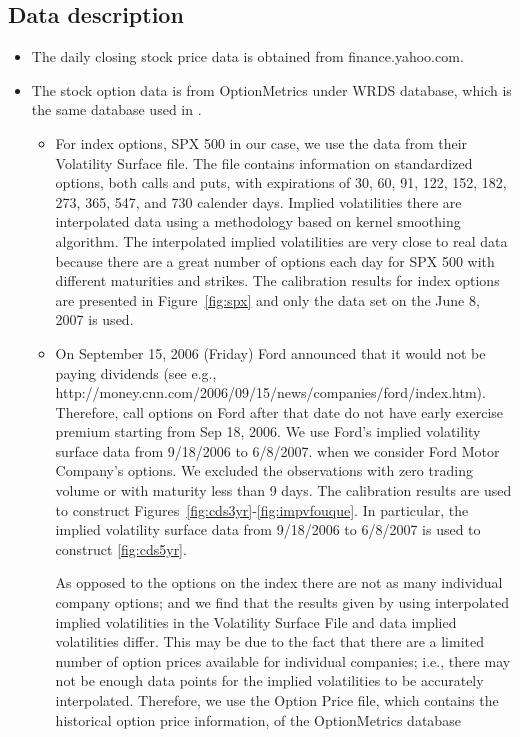\documentclass[11pt]{article}
\numberwithin{equation}{section}
\begin{document}
\subsection{Data description}\label{sec:data-desc}
\begin{itemize}
\item The daily closing stock price data is obtained from finance.yahoo.com.

\item The stock option data is from OptionMetrics under WRDS database, which is the same database used in \cite{carr-wu}.
\begin{itemize}
\item For index options, SPX 500 in our case, we use the data from their
Volatility Surface file. The file contains
information on standardized options, both calls and puts, with
expirations of 30, 60, 91, 122, 152, 182, 273, 365, 547, and 730
calender days. Implied volatilities there are interpolated data
using a methodology based on kernel smoothing algorithm. The
interpolated implied volatilities are very close to real data
because there are a great number of options each day for SPX 500 with
different maturities and strikes. The calibration results for index options are presented in Figure~\ref{fig:spx} and only the data set on the June 8, 2007 is used.

\item On September 15, 2006 (Friday) Ford announced that it would not be paying dividends (see e.g., {http://money.cnn.com/2006/09/15/news/companies/ford/index.htm}).  Therefore, call options on Ford after that date do not have early exercise premium starting from Sep 18, 2006. We use Ford's implied volatility surface data from 9/18/2006 to 6/8/2007. 
when we consider Ford Motor Company's options. We excluded the
observations with zero trading volume or with maturity less than 9 days.
The calibration results are used to construct Figures~\ref{fig:cds3yr}-\ref{fig:impvfouque}. In particular, the implied volatility surface data from 9/18/2006 to 6/8/2007 is used to construct \ref{fig:cds5yr}. 

\hspace{0.1in}As opposed to the options on the index there are not as many 
individual company options; and we find that the results given by
using interpolated implied volatilities in the Volatility Surface File and data implied volatilities differ.
This may be due to the fact that there are a limited number of option prices available for individual
companies; i.e., there may not be enough data points for the implied volatilities to be accurately
interpolated. Therefore, we use the Option Price file, which contains the historical option price information, of the OptionMetrics database \end{itemize}


\end{itemize}
\end{document}
